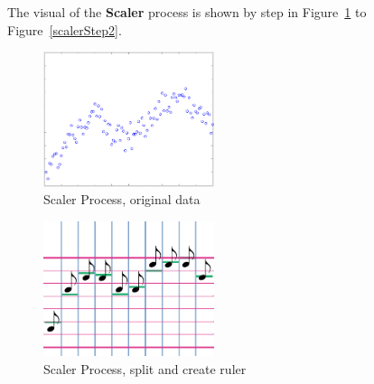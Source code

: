    The visual of the \textbf{Scaler} process is shown by step in Figure~\ref{scalerStep0}
   to Figure~\ref{scalerStep2}. 

\begin{figure}[H]
\centering
\newcommand{\widthOfScalerStepFigure}{5cm}
\includegraphics[width=\widthOfScalerStepFigure]{figWR/scaler0}
\caption{Scaler Process, original data}
\label{scalerStep0}
\end{figure}

\begin{figure}[H]
\centering
\newcommand{\widthOfScalerStepFigure}{5cm}
\includegraphics[width=\widthOfScalerStepFigure]{figWR/scaler1}
\caption{Scaler Process, split and create ruler}
\label{scalerStep1}
\end{figure}


